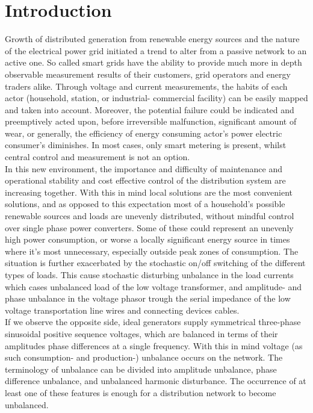 \chapter{Introduction}

Growth of distributed generation from renewable energy sources and the nature of the electrical power grid initiated a trend to alter from a passive network to an active one. So called smart grids have the ability to provide much more in depth observable measurement results of their customers, grid operators and energy traders alike. Through voltage and current measurements, the habits of each actor (household, station, or industrial- commercial facility) can be easily mapped and taken into account. Moreover, the potential failure could be indicated and preemptively acted upon, before irreversible malfunction, significant amount of wear, or generally, the efficiency of energy consuming actor's power electric consumer's diminishes. In most cases, only smart metering is present, whilst central control and measurement is not an option.\\
 In this new environment, the importance and difficulty of maintenance and operational stability and cost effective control of the distribution system are increasing together. With this in mind local solutions are the most convenient solutions, and as opposed to this expectation most of a household's possible renewable sources and loads are unevenly distributed, without mindful control over single phase power converters. Some of these could represent an unevenly high power consumption, or worse a locally significant energy source in times where it's most unnecessary, especially outside peak zones of consumption. The situation is further exacerbated by the stochastic on/off switching of the different types of loads. This cause stochastic disturbing unbalance in the load currents which cases unbalanced load of the low voltage transformer, and amplitude- and phase unbalance in the voltage phasor trough the serial impedance of the low voltage transportation line wires and connecting devices cables.\\
If we observe the opposite side, ideal generators supply symmetrical three-phase sinusoidal positive sequence voltages, which are balanced in terms of their amplitudes phase differences at a single frequency. With this in mind voltage (as such consumption- and production-) unbalance occurs on the network. The terminology of unbalance can be divided into amplitude unbalance, phase difference unbalance, and unbalanced harmonic disturbance. The occurrence of at least one of these features is enough for a distribution network to become unbalanced. \\
